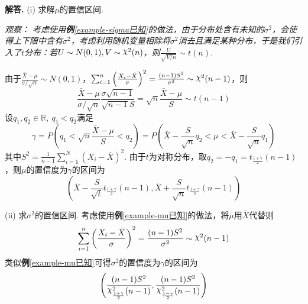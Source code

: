 \documentclass[12pt, a4paper, oneside]{ctexart}
\numberwithin{equation}{section}  %
\newenvironment{solution}[1][]{\par\noindent\textbf{#1解答. }}{\smallskip\par}  %
\newenvironment{watch}{\it 观察：}{}
\DeclareRobustCommand{\rchi}{{\mathpalette\irchi\relax}}
\newcommand{\irchi}[2]{\raisebox{\depth}{$#1\chi$}} %
\def\R{\mathbb{R}}          %
\def\add{\vspace{1ex}}      %
\begin{document}
\begin{solution}
    (i) 求解$\mu$的置信区间. 

    \begin{watch}
        考虑使用\textbf{例}\ref{example-sigma已知}的做法，由于分布处含有未知的$\sigma^2$，会使得上下限中含有$\sigma^2$，考虑利用随机变量相除将$\sigma^2$消去且满足某种分布，\add 于是我们引入了$t$分布：若$U\sim N(0,1), V\sim\rchi^2(n)$，则$\textstyle\frac{U}{\sqrt{V/n}}\sim t(n)$.\add
    \end{watch}

    由于$\frac{\bar{X}-\mu}{\sigma/\sqrt{n}}\sim N(0,1)$，$\sum_{i=1}^n\left(\frac{X_i-\bar{X}}{\sigma}\right)^2=\frac{(n-1)S^2}{\sigma^2}\sim\rchi^2(n-1)$，则
    \begin{equation*}
        \frac{\bar{X}-\mu}{\sigma/\sqrt{n}}\frac{\sigma\sqrt{n-1}}{\sqrt{n-1}S} = \sqrt{n}\frac{\bar{X}-\mu}{S}\sim t(n-1)
    \end{equation*}
    设$q_1,q_2\in\R,\ q_1<q_2$满足
    \begin{equation*}
        \gamma = P\left(q_1 < \sqrt{n}\frac{\bar{X}-\mu}{S}<q_2\right) = P\left(\bar{X}-\frac{S}{\sqrt{n}}q_2<\mu<\bar{X}-\frac{S}{\sqrt{n}}q_1\right)
    \end{equation*}
    其中$S^2=\frac{1}{n-1}\sum_{i=1}^N(X_i-\bar{X})^2$. 由于$t$为对称分布，取$q_2=-q_1 = t_{\frac{1+\gamma}{2}}(n-1)$，则$\mu$的置信度为$\gamma$的区间为
    \begin{equation*}
        \left(\bar{X}-\frac{S}{\sqrt{t}}t_{\frac{1+\gamma}{2}}(n-1),\bar{X}+\frac{S}{\sqrt{n}}t_{\frac{1+\gamma}{2}}(n-1)\right)
    \end{equation*}

    (ii) 求$\sigma^2$的置信区间. 考虑使用\textbf{例}\ref{example-mu已知}的做法，将$\mu$用$\bar{X}$代替则
    \begin{equation*}
        \sum_{i=1}^n\left(\frac{X_i-\bar{X}}{\sigma}\right)^2 = \frac{(n-1)S^2}{\sigma^2} \sim \rchi^2(n-1)
    \end{equation*}
    类似\textbf{例}\ref{example-mu已知}可得$\sigma^2$的置信度为$\gamma$的区间为
    \begin{equation*}
        \left(\frac{(n-1)S^2}{\rchi^2_{\frac{1+\gamma}{2}}(n-1)},\frac{(n-1)S^2}{\rchi^2_{\frac{1-\gamma}{2}}(n-1)}\right)
    \end{equation*}
\end{solution}
\end{document}
